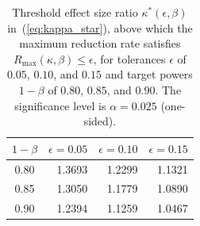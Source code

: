 \begin{table}[ht]
\centering
\small
\caption{Threshold effect size ratio $\kappa^{*}(\epsilon, \beta)$ in~(\ref{eq:kappa_star}), above which the maximum reduction rate satisfies $R_{\max}(\kappa, \beta) \leq \epsilon$, for tolerances $\epsilon$ of $0.05$, $0.10$, and $0.15$ and target powers $1 - \beta$ of $0.80$, $0.85$, and $0.90$. The significance level is $\alpha = 0.025$ (one-sided).}
\label{tab:kappa_star}
\begin{threeparttable}
\begin{tabular}{crrr}
\hline
$1 - \beta$ & $\epsilon = 0.05$ & $\epsilon = 0.10$ & $\epsilon = 0.15$ \\
\hline
0.80 & 1.3693 & 1.2299 & 1.1321 \\
0.85 & 1.3050 & 1.1779 & 1.0890 \\
0.90 & 1.2394 & 1.1259 & 1.0467 \\
\hline
\end{tabular}
\end{threeparttable}
\end{table}
